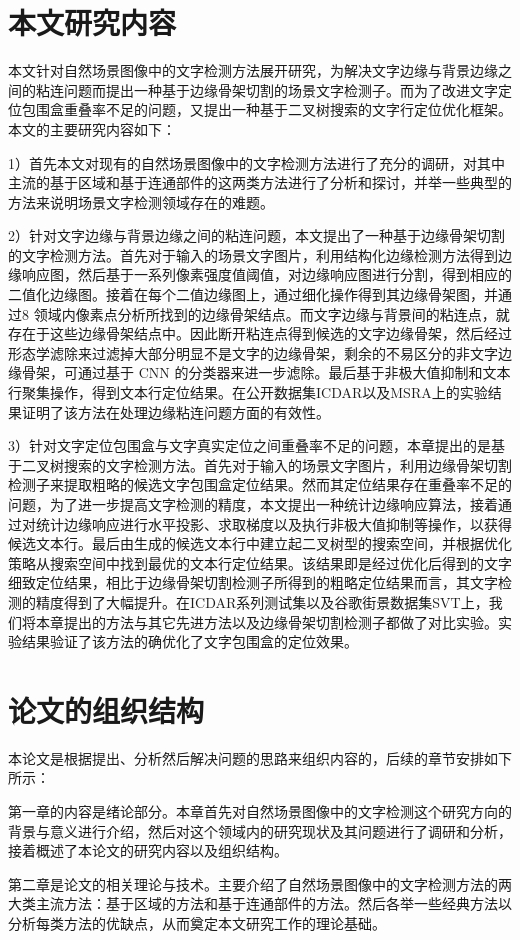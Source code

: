     \section{本文研究内容}
    
    本文针对自然场景图像中的文字检测方法展开研究，为解决文字边缘与背景边缘之间的粘连问题而提出一种基于边缘骨架切割的场景文字检测子。而为了改进文字定位包围盒重叠率不足的问题，又提出一种基于二叉树搜索的文字行定位优化框架。本文的主要研究内容如下：
    
    1）首先本文对现有的自然场景图像中的文字检测方法进行了充分的调研，对其中主流的基于区域和基于连通部件的这两类方法进行了分析和探讨，并举一些典型的方法来说明场景文字检测领域存在的难题。
    
    2）针对文字边缘与背景边缘之间的粘连问题，本文提出了一种基于边缘骨架切割的文字检测方法。首先对于输入的场景文字图片，利用结构化边缘检测方法得到边缘响应图，然后基于一系列像素强度值阈值，对边缘响应图进行分割，得到相应的二值化边缘图。接着在每个二值边缘图上，通过细化操作得到其边缘骨架图，并通过8 领域内像素点分析所找到的边缘骨架结点。而文字边缘与背景间的粘连点，就存在于这些边缘骨架结点中。因此断开粘连点得到候选的文字边缘骨架，然后经过形态学滤除来过滤掉大部分明显不是文字的边缘骨架，剩余的不易区分的非文字边缘骨架，可通过基于 CNN 的分类器来进一步滤除。最后基于非极大值抑制和文本行聚集操作，得到文本行定位结果。在公开数据集ICDAR以及MSRA上的实验结果证明了该方法在处理边缘粘连问题方面的有效性。
    
    3）针对文字定位包围盒与文字真实定位之间重叠率不足的问题，本章提出的是基于二叉树搜索的文字检测方法。首先对于输入的场景文字图片，利用边缘骨架切割检测子来提取粗略的候选文字包围盒定位结果。然而其定位结果存在重叠率不足的问题，为了进一步提高文字检测的精度，本文提出一种统计边缘响应算法，接着通过对统计边缘响应进行水平投影、求取梯度以及执行非极大值抑制等操作，以获得候选文本行。最后由生成的候选文本行中建立起二叉树型的搜索空间，并根据优化策略从搜索空间中找到最优的文本行定位结果。该结果即是经过优化后得到的文字细致定位结果，相比于边缘骨架切割检测子所得到的粗略定位结果而言，其文字检测的精度得到了大幅提升。在ICDAR系列测试集以及谷歌街景数据集SVT上，我们将本章提出的方法与其它先进方法以及边缘骨架切割检测子都做了对比实验。实验结果验证了该方法的确优化了文字包围盒的定位效果。

    \section{论文的组织结构}

    本论文是根据提出、分析然后解决问题的思路来组织内容的，后续的章节安排如下所示：
    
    第一章的内容是绪论部分。本章首先对自然场景图像中的文字检测这个研究方向的背景与意义进行介绍，然后对这个领域内的研究现状及其问题进行了调研和分析，接着概述了本论文的研究内容以及组织结构。
    
    第二章是论文的相关理论与技术。主要介绍了自然场景图像中的文字检测方法的两大类主流方法：基于区域的方法和基于连通部件的方法。然后各举一些经典方法以分析每类方法的优缺点，从而奠定本文研究工作的理论基础。
